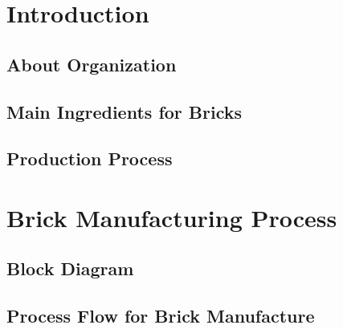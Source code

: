 \documentclass{article}
\begin{document}

\newpage





\newpage

\tableofcontents
{}

\newpage
{}

\section{Introduction}

\subsection{About Organization}

\subsection{Main Ingredients for Bricks}

\subsection{Production Process}

\section{Brick Manufacturing Process}

\subsection{Block Diagram}

\subsection{Process Flow for Brick Manufacture}
\end{document}
